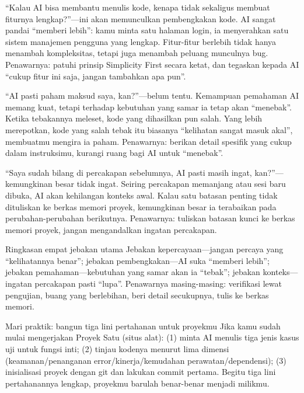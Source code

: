 
“Kalau AI bisa membantu menulis kode, kenapa tidak sekaligus membuat fiturnya lengkap?”—ini akan memunculkan pembengkakan kode. AI sangat pandai “memberi lebih”: kamu minta satu halaman login, ia menyerahkan satu sistem manajemen pengguna yang lengkap. Fitur-fitur berlebih tidak hanya menambah kompleksitas, tetapi juga menambah peluang munculnya bug. Penawarnya: patuhi prinsip Simplicity First secara ketat, dan tegaskan kepada AI “cukup fitur ini saja, jangan tambahkan apa pun”.


“AI pasti paham maksud saya, kan?”—belum tentu. Kemampuan pemahaman AI memang kuat, tetapi terhadap kebutuhan yang samar ia tetap akan “menebak”. Ketika tebakannya meleset, kode yang dihasilkan pun salah. Yang lebih merepotkan, kode yang salah tebak itu biasanya “kelihatan sangat masuk akal”, membuatmu mengira ia paham. Penawarnya: berikan detail spesifik yang cukup dalam instruksimu, kurangi ruang bagi AI untuk “menebak”.


“Saya sudah bilang di percakapan sebelumnya, AI pasti masih ingat, kan?”—kemungkinan besar tidak ingat. Seiring percakapan memanjang atau sesi baru dibuka, AI akan kehilangan konteks awal. Kalau satu batasan penting tidak dituliskan ke berkas memori proyek, kemungkinan besar ia terabaikan pada perubahan-perubahan berikutnya. Penawarnya: tuliskan batasan kunci ke berkas memori proyek, jangan mengandalkan ingatan percakapan.

\begin{tcbwarn}{Ringkasan empat jebakan utama}
Jebakan kepercayaan—jangan percaya yang “kelihatannya benar”; jebakan pembengkakan—AI suka “memberi lebih”; jebakan pemahaman—kebutuhan yang samar akan ia “tebak”; jebakan konteks—ingatan percakapan pasti “lupa”. Penawarnya masing-masing: verifikasi lewat pengujian, buang yang berlebihan, beri detail secukupnya, tulis ke berkas memori.

\end{tcbwarn}

\begin{tcbpractice}{Mari praktik: bangun tiga lini pertahanan untuk proyekmu}
Jika kamu sudah mulai mengerjakan Proyek Satu (situs alat): (1) minta AI menulis tiga jenis kasus uji untuk fungsi inti; (2) tinjau kodenya menurut lima dimensi (keamanan/penanganan error/kinerja/kemudahan perawatan/dependensi); (3) inisialisasi proyek dengan git dan lakukan commit pertama. Begitu tiga lini pertahanannya lengkap, proyekmu barulah benar-benar menjadi milikmu.

\end{tcbpractice}

